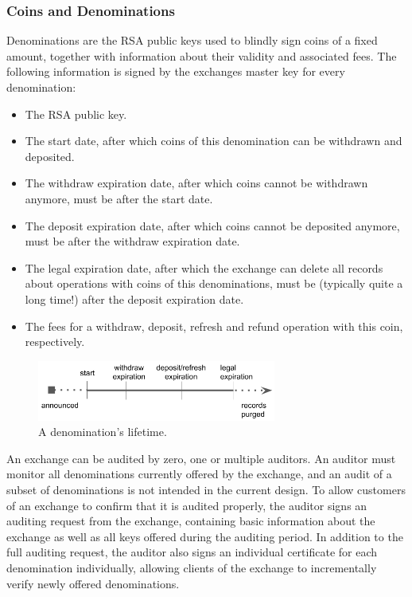 \subsubsection{Coins and Denominations}\label{sec:implementation:denoms}
Denominations are the RSA public keys used to blindly sign coins of a fixed amount, together with information about their
validity and associated fees.  The following information is signed by the exchanges master key for every denomination:
\begin{itemize}
  \item The RSA public key.
  \item The start date, after which coins of this denomination can be withdrawn and deposited.
  \item The withdraw expiration date, after which coins cannot be withdrawn anymore, must be after the start date.
  \item The deposit expiration date, after which coins cannot be deposited anymore, must be after the withdraw expiration date.
  \item The legal expiration date, after which the exchange can delete all records about operations with coins of this denominations,
    must be (typically quite a long time!) after the deposit expiration date.
  \item The fees for a withdraw, deposit, refresh and refund operation with this coin, respectively.
\end{itemize}

\begin{figure}
    \centering
    \includegraphics[width=0.7\textwidth]{diagrams/taler-diagram-denom-expiration.png}
    \caption{A denomination's lifetime.}
\end{figure}

An exchange can be audited by zero, one or multiple auditors.  An auditor must
monitor all denominations currently offered by the exchange, and an audit of a
subset of denominations is not intended in the current design.  To allow
customers of an exchange to confirm that it is audited properly, the auditor
signs an auditing request from the exchange, containing basic information about
the exchange as well as all keys offered during the auditing period.  In
addition to the full auditing request, the auditor also signs an individual
certificate for each denomination individually, allowing clients of the
exchange to incrementally verify newly offered denominations.

